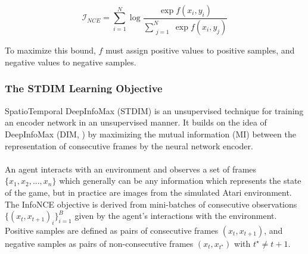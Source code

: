 \begin{equation}
\mathcal{I}_{NCE}=\sum_{i=1}^N\log{\frac{\exp{f(x_i,y_i)}}{\sum\limits_{\substack{j=1}}^N \exp{f(x_i,y_j)}}}
\label{eqn:info-nce}
\end{equation}

To maximize this bound, $f$ must assign positive values to positive samples, and negative values to negative samples.

\subsubsection{The STDIM Learning Objective}
SpatioTemporal DeepInfoMax (STDIM) is an unsupervised technique for training an encoder network in an unsupervised manner. It builds on the idea of DeepInfoMax (DIM, \cite{DIM}) by maximizing the mutual information (MI) between the representation of consecutive frames by the neural network encoder.
\\\\
An agent interacts with an environment and observes a set of frames $\{x_1, x_2,...,x_n\}$ which generally can be any information which represents the state of the game, but in practice are images from the simulated Atari environment. The InfoNCE objective is derived from mini-batches of consecutive observations $\{(x_t,x_{t+1})_i\}_{i=1}^{B}$ given by the agent's interactions with the environment. Positive samples are defined as pairs of consecutive frames $(x_t,x_{t+1})$, and negative samples as pairs of non-consecutive frames $(x_t,x_{t^\star})$ with $t^\star\ne t+1$. \\


